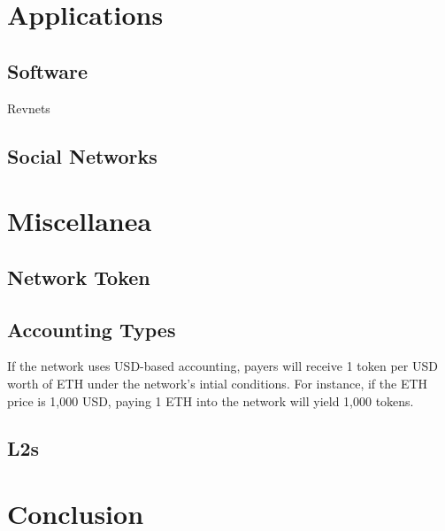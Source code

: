 \documentclass{article}
\begin{document}
\section{Applications}


\subsection{}

\subsection{Software}

Revnets 

\subsection{Social Networks}

\section{Miscellanea}

\subsection{Network Token}

\subsection{Accounting Types}\label{sec:accounting_types}

If the network uses USD-based accounting, payers will receive 1 token per USD worth of ETH under the network's intial conditions. For instance, if the ETH price is 1,000 USD, paying 1 ETH into the network will yield 1,000 tokens.

\subsection{L2s}

\section{Conclusion}

% 
% 
\end{document}
